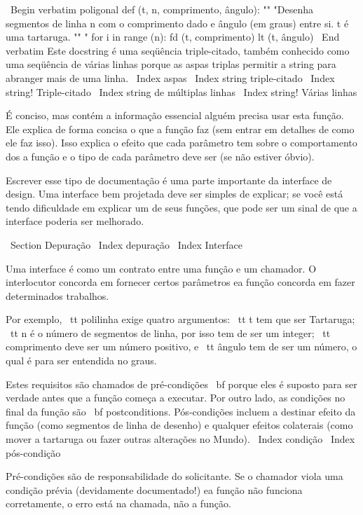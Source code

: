 \documentclass[10pt]{book}
\begin{document}
{\ Begin {verbatim}
poligonal def (t, n, comprimento, ângulo):
    "" "Desenha segmentos de linha n com o comprimento dado e
    ângulo (em graus) entre si. t é uma tartaruga.
    "" "    
    for i in range (n):
        fd (t, comprimento)
        lt (t, ângulo)
\ End {verbatim}
%
Este docstring é uma seqüência triple-citado, também conhecido
como uma seqüência de várias linhas porque as aspas triplas permitir a string
para abranger mais de uma linha.
\ Index {aspas}
\ Index {string triple-citado}
\ Index {string! Triple-citado}
\ Index {string de múltiplas linhas}
\ Index {string! Várias linhas}

É conciso, mas contém a informação essencial
alguém precisa usar esta função. Ele explica de forma concisa o que
a função faz (sem entrar em detalhes de como ele faz
isso). Isso explica o efeito que cada parâmetro tem sobre o comportamento dos
a função e o tipo de cada parâmetro deve ser (se não estiver
óbvio).

Escrever esse tipo de documentação é uma parte importante da interface de
design. Uma interface bem projetada deve ser simples de explicar;
se você está tendo dificuldade em explicar um de seus funções,
que pode ser um sinal de que a interface poderia ser melhorado.


\ Section {} Depuração
\ Index {depuração}
\ Index {Interface}

Uma interface é como um contrato entre uma função e um chamador.
O interlocutor concorda em fornecer certos parâmetros ea função
concorda em fazer determinados trabalhos.

Por exemplo, {\ tt polilinha} exige quatro argumentos: {\ tt t} tem que ser
Tartaruga; {\ tt n} é o número de segmentos de linha, por isso tem de ser um
integer; {\ tt comprimento} deve ser um número positivo, e {\ tt
  ângulo} tem de ser um número, o qual é para ser entendida no graus.

Estes requisitos são chamados de pré-condições {\ bf} porque eles
é suposto para ser verdade antes que a função começa a executar.
Por outro lado, as condições no final da função são
{\ bf postconditions}. Pós-condições incluem a destinar
efeito da função (como segmentos de linha de desenho) e qualquer
efeitos colaterais (como mover a tartaruga ou fazer outras alterações
no Mundo).
\ Index {condição}
\ Index {pós-condição}

Pré-condições são de responsabilidade do solicitante. Se o chamador
viola uma condição prévia (devidamente documentado!) ea função
não funciona corretamente, o erro está na chamada, não a função.

}
\end{document}
